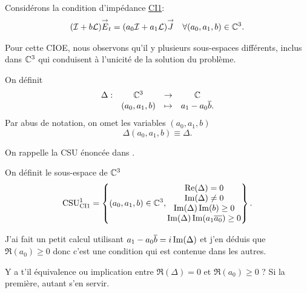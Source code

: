     Considérons la condition d’impédance \hyperlink{ci1}{CI1}:
    \begin{align}
    \label{eq:unicite:ci1}
      (\oI + b \LL) \vE_t = (a_0\oI + a_1 \LL) \vJ && \forall (a_0, a_1,b) \in \CC^3.
    \end{align}

    Pour cette CIOE, nous observons qu'il y plusieurs sous-espaces différents, inclus dans \(\CC^3\) qui conduisent à l'unicité de la solution du problème.


    On définit 
    \begin{equation}
      \label{eq:unicite:delta}
      \begin{matrix}
        \Delta: & \CC^3 &\rightarrow& \CC
        \\
        & (a_0,a_1,b) & \mapsto & a_1 - a_0\conj{b}.
      \end{matrix}
    \end{equation}
    Par abus de notation, on omet les variables \((a_0,a_1,b)\)
    \begin{equation}
       \Delta(a_0,a_1,b) \equiv \Delta.
    \end{equation}

    On rappelle la CSU énoncée dans \cite{stupfel_sufficient_2011}.

    \begin{defn}
      \label{def:csu:ci1-1}

      On définit le sous-espace de \(\CC^3\)
      \begin{equation*}
        \CSU[1]{CI1} = \left\lbrace 
        (a_0,a_1,b) \in \CC^3,
        \begin{matrix}
        \Re(\Delta) = 0
        \\
        \Im(\Delta) \not = 0
        \\
        \Im(\Delta)\Im(b) \ge 0
        \\
        \Im(\Delta )\Im(a_1\conj{a_0})\ge 0
        \end{matrix}
        \right\rbrace.
      \end{equation*}
    \end{defn}

    \begin{REM}
      J'ai fait un petit calcul utilisant \(a_1-a_0\conj{b}=i\Im(\Delta)\) et j'en déduis que \(\Re(a_0)\ge0\) donc c'est une condition qui est contenue dans
      les autres.
    \end{REM}
    \begin{REP}
      Y a t'il équivalence ou implication entre \(\Re(\Delta) = 0\) et \(\Re(a_0)\ge0\) ? Si la première, autant s'en servir.
    \end{REP}

